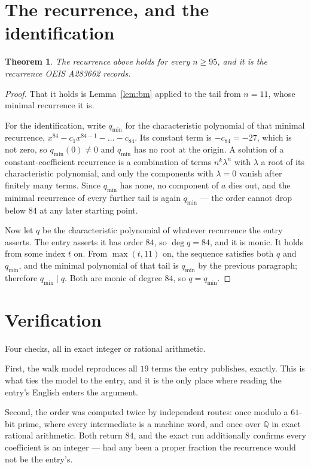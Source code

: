 \documentclass[11pt,a4paper]{article}
\theoremstyle{plain}
\newtheorem{theorem}{Theorem}
\theoremstyle{definition}
\begin{document}
\section{The recurrence, and the identification}

\begin{theorem}
The recurrence above holds for every $n\ge95$, and it is the recurrence OEIS A283662 records.
\end{theorem}

\begin{proof}
That it holds is Lemma~\ref{lem:bm} applied to the tail from $n=11$, whose minimal
recurrence it is.

For the identification, write $q_{\min}$ for the characteristic polynomial of that minimal
recurrence, $x^{84}-c_1x^{84-1}-\dots-c_{84}$. Its constant term is
$-c_{84}=-27$, which is not zero, so $q_{\min}(0)\neq0$ and $q_{\min}$ has no
root at the origin. A solution of a constant-coefficient recurrence is a combination of terms
$n^{k}\lambda^{n}$ with $\lambda$ a root of its characteristic polynomial, and only the
components with $\lambda=0$ vanish after finitely many terms. Since $q_{\min}$ has none, no
component of $a$ dies out, and the minimal recurrence of every further tail is again
$q_{\min}$ --- the order cannot drop below $84$ at any later starting point.

Now let $q$ be the characteristic polynomial of whatever recurrence the entry asserts. The
entry asserts it has order $84$, so $\deg q=84$, and it is monic. It holds from some
index $t$ on. From $\max(t,11)$ on, the sequence satisfies both $q$ and $q_{\min}$, and
the minimal polynomial of that tail is $q_{\min}$ by the previous paragraph; therefore
$q_{\min}\mid q$. Both are monic of degree $84$, so $q=q_{\min}$.
\end{proof}

\section{Verification}

Four checks, all in exact integer or rational arithmetic.

First, the walk model reproduces all $19$ terms the entry publishes, exactly. This is
what ties the model to the entry, and it is the only place where reading the entry's English
enters the argument.

Second, the order was computed twice by independent routes: once modulo a $61$-bit prime, where
every intermediate is a machine word, and once over $\mathbb{Q}$ in exact rational arithmetic.
Both return $84$, and the exact run additionally confirms every coefficient is an integer
--- had any been a proper fraction the recurrence would not be the entry's.
\end{document}
